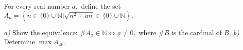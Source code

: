 For every real number $ a, $ define the set $ A_a=\left\{ n\in\{ 0\}\cup\mathbb{N}\bigg|\sqrt{n^2+an}\in\{ 0\}\cup\mathbb{N}\right\} . $

\textit{a)} Show the equivalence: $ \# A_a\in\mathbb{N}\iff a\neq 0,  $ where $ \# B $ is the cardinal of $ B. $
\textit{b)} Determine $ \max A_{40} . $